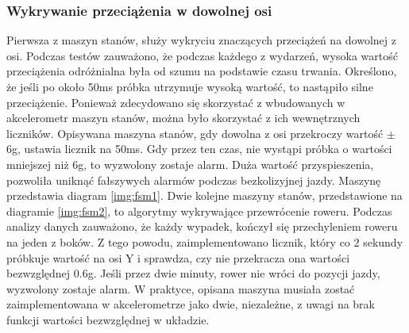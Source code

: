 \subsubsection{Wykrywanie przeciążenia w dowolnej osi}
Pierwsza z maszyn stanów, służy wykryciu znaczących przeciążeń na dowolnej z osi. Podczas testów zauważono, że podczas każdego z wydarzeń, wysoka wartość przeciążenia odróżnialna była od szumu na podstawie czasu trwania. Określono, że jeśli po około 50ms próbka utrzymuje wysoką wartość, to nastąpiło silne przeciążenie. Ponieważ zdecydowano się skorzystać z wbudowanych w akcelerometr maszyn stanów, można było skorzystać z ich wewnętrznych liczników. Opisywana maszyna stanów, gdy dowolna z osi przekroczy wartość $\pm$6g, ustawia licznik na 50ms. Gdy przez ten czas, nie wystąpi próbka o wartości mniejszej niż 6g, to wyzwolony zostaje alarm. Duża wartość przyspieszenia, pozwoliła uniknąć fałszywych alarmów podczas bezkolizyjnej jazdy. Maszynę przedstawia diagram \ref{img:fsm1}.
\newline
\newline
Dwie kolejne maszyny stanów, przedstawione na diagramie \ref{img:fsm2}, to algorytmy wykrywające przewrócenie roweru. Podczas analizy danych zauważono, że każdy wypadek, kończył się przechyleniem roweru na jeden z boków. Z tego powodu, zaimplementowano licznik, który co 2 sekundy próbkuje wartość na osi Y i sprawdza, czy nie przekracza ona wartości bezwzględnej 0.6g. Jeśli przez dwie minuty, rower nie wróci do pozycji jazdy, wyzwolony zostaje alarm. W praktyce, opisana maszyna musiała zostać zaimplementowana w akcelerometrze jako dwie, niezależne, z uwagi na brak funkcji wartości bezwzględnej w układzie.
